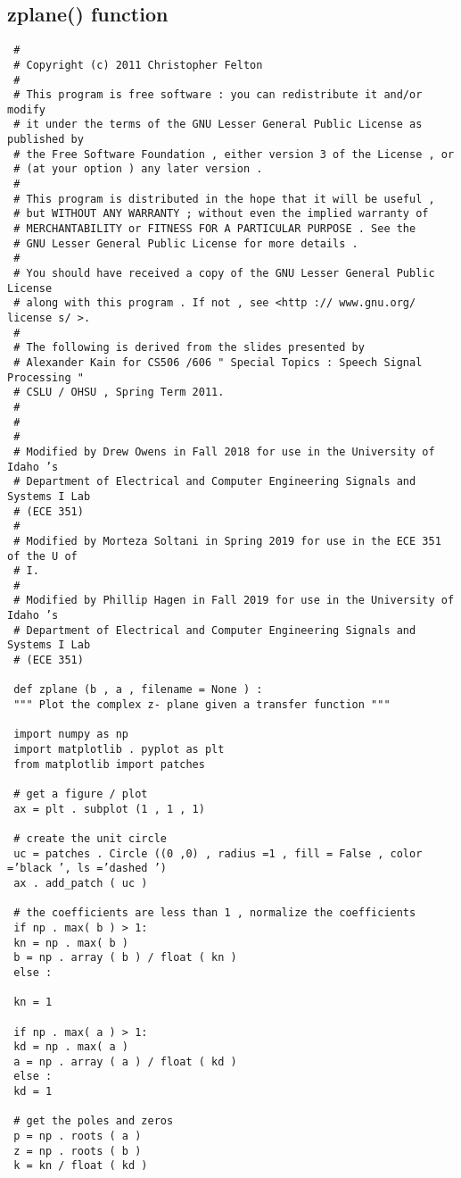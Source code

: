 \documentclass[12pt]{report}
\begin{document}
\subsection{zplane() function}
\begin{verbatim}
 #
 # Copyright (c) 2011 Christopher Felton
 #
 # This program is free software : you can redistribute it and/or modify
 # it under the terms of the GNU Lesser General Public License as published by
 # the Free Software Foundation , either version 3 of the License , or
 # (at your option ) any later version .
 #
 # This program is distributed in the hope that it will be useful ,
 # but WITHOUT ANY WARRANTY ; without even the implied warranty of
 # MERCHANTABILITY or FITNESS FOR A PARTICULAR PURPOSE . See the
 # GNU Lesser General Public License for more details .
 #
 # You should have received a copy of the GNU Lesser General Public License
 # along with this program . If not , see <http :// www.gnu.org/ license s/ >.
 #
 # The following is derived from the slides presented by
 # Alexander Kain for CS506 /606 " Special Topics : Speech Signal Processing "
 # CSLU / OHSU , Spring Term 2011.
 #
 #
 #
 # Modified by Drew Owens in Fall 2018 for use in the University of Idaho ’s
 # Department of Electrical and Computer Engineering Signals and Systems I Lab
 # (ECE 351)
 #
 # Modified by Morteza Soltani in Spring 2019 for use in the ECE 351 of the U of
 # I.
 #
 # Modified by Phillip Hagen in Fall 2019 for use in the University of Idaho ’s
 # Department of Electrical and Computer Engineering Signals and Systems I Lab
 # (ECE 351)

 def zplane (b , a , filename = None ) :
 """ Plot the complex z- plane given a transfer function """

 import numpy as np
 import matplotlib . pyplot as plt
 from matplotlib import patches

 # get a figure / plot
 ax = plt . subplot (1 , 1 , 1)

 # create the unit circle
 uc = patches . Circle ((0 ,0) , radius =1 , fill = False , color =’black ’, ls =’dashed ’)
 ax . add_patch ( uc )

 # the coefficients are less than 1 , normalize the coefficients
 if np . max( b ) > 1:
 kn = np . max( b )
 b = np . array ( b ) / float ( kn )
 else :

 kn = 1

 if np . max( a ) > 1:
 kd = np . max( a )
 a = np . array ( a ) / float ( kd )
 else :
 kd = 1

 # get the poles and zeros
 p = np . roots ( a )
 z = np . roots ( b )
 k = kn / float ( kd )


\end{verbatim}
\end{document}
